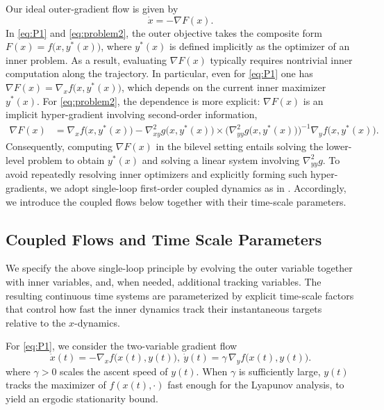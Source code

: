 \documentclass{article}
\newcommand{\1}{\mathbf{1}}
\begin{document}
Our ideal outer-gradient flow is given by
\begin{equation}
\label{eq:bi-gf}
    \dot x=-\nabla F(x).
\end{equation}
In \ref{eq:P1} and \ref{eq:problem2}, the outer objective takes the composite form
$F(x)=f\bigl(x,y^*(x)\bigr)$, where $y^*(x)$ is defined implicitly as the optimizer of an inner problem.
As a result, evaluating $\nabla F(x)$ typically requires nontrivial inner computation along the trajectory.
In particular, even for \ref{eq:P1} one has $\nabla F(x)=\nabla_x f\bigl(x,y^*(x)\bigr)$, which depends on the
current inner maximizer $y^*(x)$.
For \ref{eq:problem2}, the dependence is more explicit: $\nabla F(x)$ is an implicit hyper-gradient involving
second-order information,
\begin{equation}\label{eq:hypergrad}
\begin{aligned}
\nabla F(x)
&=\nabla_x f\bigl(x,y^{*}(x)\bigr)-\nabla^2_{xy}g\bigl(x,y^{*}(x)\bigr)\times\bigl(\nabla^2_{yy}g\bigl(x,y^{*}(x)\bigr)\bigr)^{-1}\nabla_y f\bigl(x,y^{*}(x)\bigr).
\end{aligned}
\end{equation} 
Consequently, computing $\nabla F(x)$ in the bilevel setting entails solving the lower-level problem to obtain $y^*(x)$ and solving a linear system involving $\nabla^2_{yy}g$.
To avoid repeatedly resolving inner optimizers and explicitly forming such hyper-gradients, we adopt single-loop first-order coupled dynamics as in \cite{kwon2023fully}. Accordingly, we introduce the coupled flows below together with their time-scale parameters.


\subsection{Coupled Flows and Time Scale Parameters}\label{subsec:unified-flows} 


We specify the above single-loop principle by evolving the outer variable together with inner variables, and, when needed, additional tracking variables.
The resulting continuous time systems are parameterized by explicit time-scale factors that control how fast the inner dynamics track their instantaneous targets relative to the $x$-dynamics.

For \ref{eq:P1}, we consider the two-variable gradient flow
\begin{equation}\label{eq:flow-minimax-unified}
\dot x(t) = -\nabla_x f\bigl(x(t),y(t)\bigr),\
\dot y(t) = \gamma\,\nabla_y f\bigl(x(t),y(t)\bigr).
\end{equation}
where $\gamma>0$ scales the ascent speed of $y(t)$.
    When $\gamma$ is sufficiently large, $y(t)$ tracks the maximizer of $f(x(t),\cdot)$ fast enough for the Lyapunov analysis, to yield an ergodic stationarity bound. %
\end{document}
